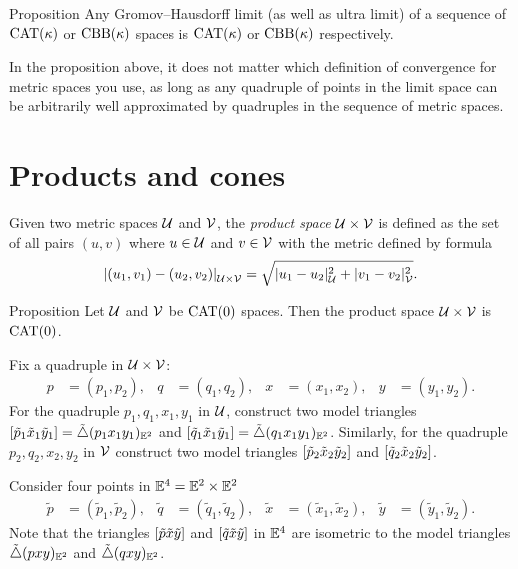 \begin{thm}{Proposition}\label{prop:cat-limit}
Any Gromov--Hausdorff limit (as well as ultra limit) of a sequence of $\mathrm{CAT}(\kappa)$ or $\mathrm{CBB}(\kappa)$ spaces is $\mathrm{CAT}(\kappa)$ or $\mathrm{CBB}(\kappa)$ respectively. 
\end{thm}

In the proposition above, 
it does not matter which definition of convergence for metric spaces you use, 
as long as any quadruple of points in the limit space can be arbitrarily well approximated by  quadruples in the sequence of metric spaces. 

\section{Products and cones}
\label{sec:Products and cones}

Given two metric spaces $\mathcal{U}$ and $\mathcal{V}$, the \emph{product space} 
$\mathcal{U}\times\mathcal{V}$ is defined as the set of all pairs $(u,v)$ where $u\in\mathcal{U}$ and $v\in \mathcal{V}$ 
with the metric defined by formula
\[\dist{(u_1,v_1)}{(u_2,v_2)}{\spc{U}\times\spc{V}}=\sqrt{\dist[2]{u_1}{u_2}{\spc{U}}+\dist[2]{v_1}{v_2}{\spc{V}}}.\]

\begin{thm}{Proposition}\label{ex:product-CAT}
Let $\mathcal{U}$ and $\mathcal{V}$ be $\mathrm{CAT}(0)$ spaces.
Then the product space $\mathcal{U}\times\mathcal{V}$ is $\mathrm{CAT}(0)$.
\end{thm}

Fix a quadruple in $\mathcal{U}\times \mathcal{V}$:
\begin{align*}
p&=(p_1,p_2),
&
q&=(q_1,q_2), 
&
x&=(x_1,x_2),
&
y&=(y_1,y_2).
\end{align*}
For the quadruple $p_1,q_1,x_1,y_1$ in $\mathcal{U}$,
construct two model triangles $[\tilde p_1\tilde x_1\tilde y_1]=\tilde\triangle(p_1x_1y_1)_{\mathbb{E}^2}$ 
and $[\tilde q_1\tilde x_1\tilde y_1]=\tilde\triangle(q_1x_1y_1)_{\mathbb{E}^2}$.  
Similarly, for the quadruple $p_2,q_2,x_2,y_2$ in $\mathcal{V}$
construct two model triangles $[\tilde p_2\tilde x_2\tilde y_2]$ and $[\tilde q_2\tilde x_2\tilde y_2]$.

Consider four points in $\mathbb{E}^4=\mathbb{E}^2\times\mathbb{E}^2$ 
\begin{align*}
\tilde p&=(\tilde p_1,\tilde p_2),
&
\tilde q&=(\tilde q_1,\tilde q_2),
&
\tilde x&=(\tilde x_1,\tilde x_2),
&
\tilde y&=(\tilde y_1,\tilde y_2).
\end{align*}
Note that the triangles $[\tilde p\tilde x\tilde y]$ and $[\tilde q\tilde x\tilde y]$ in $\mathbb{E}^4$ are isometric to the model triangles 
$\tilde\triangle(pxy)_{\mathbb{E}^2}$ and $\tilde\triangle(qxy)_{\mathbb{E}^2}$.

